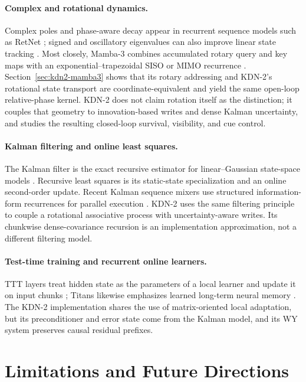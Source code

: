 \documentclass[11pt,letterpaper,logo]{yalearxiv}
\begin{document}
\paragraph{Complex and rotational dynamics.}
Complex poles and phase-aware decay appear in recurrent sequence models such as RetNet
\citep{sun2023retentive}; signed and oscillatory eigenvalues can also improve linear state
tracking \citep{grazzi2025statetracking}. Most closely, Mamba-3 combines accumulated rotary query
and key maps with an exponential--trapezoidal SISO or MIMO recurrence
\citep{lahoti2026mamba3}. Section~\ref{sec:kdn2-mamba3} shows that its rotary addressing and
KDN-2's rotational state transport are coordinate-equivalent and yield the same open-loop
relative-phase kernel. KDN-2 does not claim rotation itself as the distinction; it couples that
geometry to innovation-based writes and dense Kalman uncertainty, and studies the resulting
closed-loop survival, visibility, and cue control.

\paragraph{Kalman filtering and online least squares.}
The Kalman filter is the exact recursive estimator for linear--Gaussian state-space models
\citep{grewal2025kalman}. Recursive least squares is its static-state specialization and an online
second-order update. Recent Kalman sequence mixers use structured information-form recurrences for
parallel execution \citep{shaj2026kalmanlinearattention}. KDN-2 uses the same filtering principle
to couple a rotational associative process with uncertainty-aware writes. Its chunkwise
dense-covariance recursion is an implementation approximation, not a different filtering model.

\paragraph{Test-time training and recurrent online learners.}
TTT layers treat hidden state as the parameters of a local learner and update it on input chunks
\citep{sun2024learning}; Titans likewise emphasizes learned long-term neural memory
\citep{behrouz2024titans}. The KDN-2 implementation shares the use of matrix-oriented local
adaptation, but its preconditioner and error state come from the Kalman model, and its WY system
preserves causal residual prefixes.


\section{Limitations and Future Directions}
\label{sec:kdn2-limitations}
\end{document}
